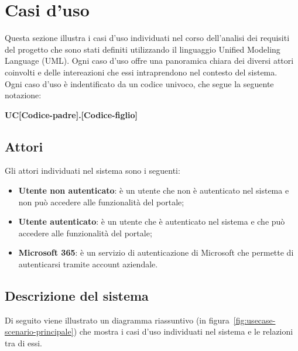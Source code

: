 \section{Casi d'uso}\label{sec:usecase}
Questa sezione illustra i casi d'uso individuati nel corso dell'analisi dei requisiti del progetto che sono stati definiti utilizzando il linguaggio Unified Modeling Language (UML).
Ogni caso d'uso offre una panoramica chiara dei diversi attori coinvolti e delle intereazioni che essi intraprendono nel contesto del sistema.\\
Ogni caso d'uso è indentificato da un codice univoco, che segue la seguente notazione:

\begin{center}
    \textbf{UC[Codice-padre].[Codice-figlio]}
  \end{center}


\subsection{Attori}
Gli attori individuati nel sistema sono i seguenti:
\begin{itemize}
    \item \textbf{Utente non autenticato}: è un utente che non è autenticato nel sistema e non può accedere alle funzionalità del portale;
    \item \textbf{Utente autenticato}: è un utente che è autenticato nel sistema e che può accedere alle funzionalità del portale;
    \item \textbf{Microsoft 365}: è un servizio di autenticazione di Microsoft che permette di autenticarsi tramite account aziendale.

\end{itemize}

\clearpage


\subsection{Descrizione del sistema}

Di seguito viene illustrato un diagramma riassuntivo (in figura~\ref{fig:usecase-scenario-principale}) che mostra i casi d'uso individuati nel sistema e le relazioni tra di essi.

